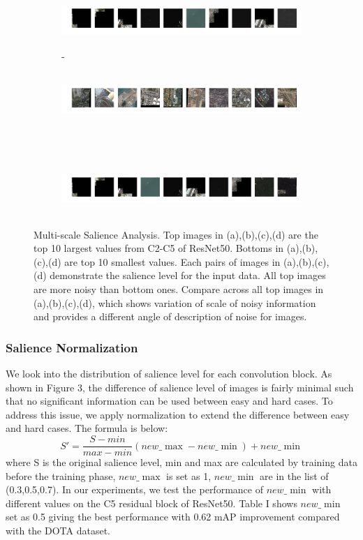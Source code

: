 \documentclass[conference]{IEEEtran}
\begin{document}
\begin{figure}[h]
   	\begin{subfigure}[b]{\linewidth}
      \includegraphics[width=\textwidth,height=2cm]{C4_1.png}
      \abovecaptionskip-\belowcaptionskip
      \caption{}
    \end{subfigure}
   	\begin{subfigure}[b]{\linewidth}
      \includegraphics[width=\textwidth,height=2cm]{C5_0.png}
    \end{subfigure}\\[-2ex]
   	\begin{subfigure}[b]{\linewidth}
      \includegraphics[width=\textwidth,height=2cm]{C5_1.png}
      \caption{}
    \end{subfigure}
    \caption{Multi-scale Salience Analysis. Top images in (a),(b),(c),(d) are the top 10 largest values from C2-C5 of ResNet50. Bottoms in (a),(b),(c),(d) are top 10 smallest values. Each pairs of images in (a),(b),(c),(d) demonstrate the salience level for the input data. All top images are more noisy than bottom ones. Compare across all top images in (a),(b),(c),(d), which shows variation of scale of noisy information and provides a different angle of description of noise for images.}
    \end{figure}
    \subsubsection{Salience Normalization}
     We look into the distribution of salience level for each convolution block. As shown in Figure 3, the difference of salience level of images is fairly minimal such that no significant information can be used between easy and hard cases. To address this issue, we apply normalization to extend the difference between easy and hard cases. The formula is below:
	\begin{equation}
		S'=\frac{S-min}{max-min}(new\_\max-new\_\min)+new\_\min
    \end{equation}	
    where S is the original salience level, min and max are calculated by training data before the training phase, \(new\_\max\) is set as 1, \(new\_\min\) are in the list of (0.3,0.5,0.7). In our experiments, we test the performance of \(new\_\min\) with different values on the C5 residual block of ResNet50\cite{he2016deep}. Table I shows \(new\_\min\) set as 0.5 giving the best performance with 0.62 mAP improvement compared with the DOTA dataset. 
\end{document}
